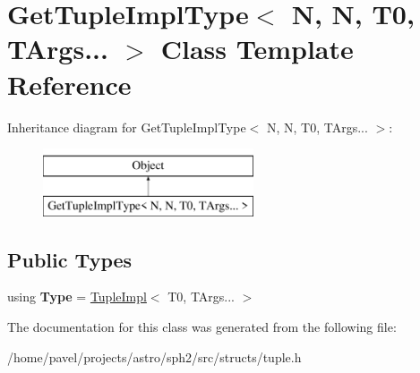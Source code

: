 \hypertarget{classGetTupleImplType_3_01N_00_01N_00_01T0_00_01TArgs_8_8_8_01_4}{}\section{Get\+Tuple\+Impl\+Type$<$ N, N, T0, T\+Args... $>$ Class Template Reference}
\label{classGetTupleImplType_3_01N_00_01N_00_01T0_00_01TArgs_8_8_8_01_4}
Inheritance diagram for Get\+Tuple\+Impl\+Type$<$ N, N, T0, T\+Args... $>$\+:\begin{figure}[H]
\begin{center}
\leavevmode
\includegraphics[height=2.000000cm]{classGetTupleImplType_3_01N_00_01N_00_01T0_00_01TArgs_8_8_8_01_4}
\end{center}
\end{figure}
\subsection*{Public Types}
\begin{DoxyCompactItemize}
\item 
\hypertarget{classGetTupleImplType_3_01N_00_01N_00_01T0_00_01TArgs_8_8_8_01_4_af6b3402d4e563daafe847e90ba20917f}{}\label{classGetTupleImplType_3_01N_00_01N_00_01T0_00_01TArgs_8_8_8_01_4_af6b3402d4e563daafe847e90ba20917f} 
using {\bfseries Type} = \hyperlink{classTupleImpl}{Tuple\+Impl}$<$ T0, T\+Args... $>$
\end{DoxyCompactItemize}


The documentation for this class was generated from the following file\+:\begin{DoxyCompactItemize}
\item 
/home/pavel/projects/astro/sph2/src/structs/tuple.\+h\end{DoxyCompactItemize}
